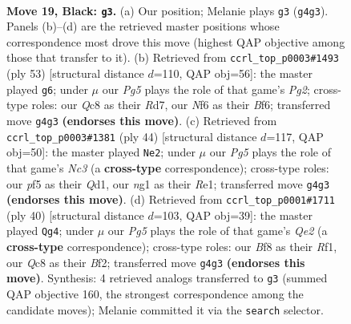 \documentclass[11pt]{article}
\begin{document}
\clearpage

\begin{figure}[p]\centering
\begin{subfigure}{0.46\textwidth}\centering
\resizebox{\linewidth}{!}{%
\newchessgame
\chessboard[
  setfen={r1q2b1r/p3kpp1/2n2n1p/5P1P/B2P2p1/8/8/R1BQK1NR b KQ - 0 19},
  showmover=false,
  pgfstyle=straightmove, color=movearrow, markmove={g4-g3}
]}
\caption{}
\end{subfigure}\hfill
\begin{subfigure}{0.46\textwidth}\centering
\resizebox{\linewidth}{!}{%
\newchessgame
\chessboard[
  setfen={6k1/1p1r1pp1/p4b2/3Pn2p/P6P/5PB1/1q4P1/3RQBK1 b - - 0 27},
  showmover=false,
  pgfstyle=straightmove, color=movearrow, markmove={g7-g6}
]}
\caption{}
\end{subfigure}
\\[4pt]
\begin{subfigure}{0.46\textwidth}\centering
\resizebox{\linewidth}{!}{%
\newchessgame
\chessboard[
  setfen={2bqr1k1/5pb1/1n1p2pp/3P3n/4PB2/2N4P/3N1PP1/3QRBK1 w - - 1 23},
  showmover=false,
  pgfstyle=straightmove, color=movearrow, markmove={c3-e2}
]}
\caption{}
\end{subfigure}\hfill
\begin{subfigure}{0.46\textwidth}\centering
\resizebox{\linewidth}{!}{%
\newchessgame
\chessboard[
  setfen={b1r1k2r/1q2bppn/p3p2p/1p2P3/3N4/PPNR4/1P2QBPP/5RK1 w k - 5 21},
  showmover=false,
  pgfstyle=straightmove, color=movearrow, markmove={e2-g4}
]}
\caption{}
\end{subfigure}
\caption{\textbf{Move 19, Black: \texttt{g3}.} (a) Our position; Melanie plays \texttt{g3} (\texttt{g4g3}). Panels (b)--(d) are the retrieved master positions whose correspondence most drove this move (highest QAP objective among those that transfer to it). (b) Retrieved from \texttt{ccrl\_top\_p0003\#1493} (ply 53) [structural distance $d$=110, QAP obj=56]: the master played \texttt{g6}; under $\mu$ our \emph{Pg5} plays the role of that game's \emph{Pg2}; cross-type roles: our \emph{Q}c8 as their \emph{R}d7, our \emph{N}f6 as their \emph{B}f6; transferred move \texttt{g4g3} \textbf{(endorses this move)}. (c) Retrieved from \texttt{ccrl\_top\_p0003\#1381} (ply 44) [structural distance $d$=117, QAP obj=50]: the master played \texttt{Ne2}; under $\mu$ our \emph{Pg5} plays the role of that game's \emph{Nc3} (a \textbf{cross-type} correspondence); cross-type roles: our \emph{p}f5 as their \emph{Q}d1, our \emph{n}g1 as their \emph{R}e1; transferred move \texttt{g4g3} \textbf{(endorses this move)}. (d) Retrieved from \texttt{ccrl\_top\_p0001\#1711} (ply 40) [structural distance $d$=103, QAP obj=39]: the master played \texttt{Qg4}; under $\mu$ our \emph{Pg5} plays the role of that game's \emph{Qe2} (a \textbf{cross-type} correspondence); cross-type roles: our \emph{B}f8 as their \emph{R}f1, our \emph{Q}c8 as their \emph{B}f2; transferred move \texttt{g4g3} \textbf{(endorses this move)}. Synthesis: 4 retrieved analogs transferred to \texttt{g3} (summed QAP objective 160, the strongest correspondence among the candidate moves); Melanie committed it via the \texttt{search} selector.}
\label{fig:thought-m37}
\end{figure}
\end{document}
